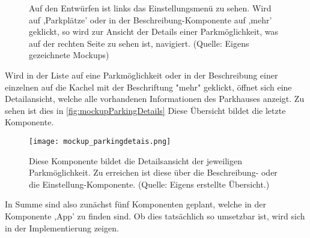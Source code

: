 \begin{figure}[h!]
	\centering
	\qquad
	\caption[Auf den Entwürfen ist links das Einstellungsmenü zu sehen. Wird auf ,Parkplätze' oder in der Beschreibung-Komponente auf ,mehr' geklickt, so wird zur Ansicht der Details einer Parkmöglichkeit, was auf der rechten Seite zu sehen ist, navigiert.]{Auf den Entwürfen ist links das Einstellungsmenü zu sehen. Wird auf ,Parkplätze' oder in der Beschreibung-Komponente auf ,mehr' geklickt, so wird zur Ansicht der Details einer Parkmöglichkeit, was auf der rechten Seite zu sehen ist, navigiert. (Quelle: Eigens gezeichnete Mockups)}
\label{fig:mockupSettings}
\label{fig:mockupParkingList}
\end{figure}
\newpage
Wird in der Liste auf eine Parkmöglichkeit oder in der Beschreibung einer einzelnen auf die Kachel mit der Beschriftung "mehr" geklickt, öffnet sich eine Detailansicht, welche alle vorhandenen Informationen des Parkhauses anzeigt. Zu sehen ist dies in \autoref{fig:mockupParkingDetails} Diese Übersicht bildet die letzte Komponente. 

\begin{figure}[h!]
	\centering
	\texttt{[image: mockup\_parkingdetais.png]}
	\caption[Diese Komponente bildet die Detailsansicht der jeweiligen Parkmöglichkeit. Zu erreichen ist diese über die Beschreibung- oder die Einstellung-Komponente.]
	{Diese Komponente bildet die Detailsansicht der jeweiligen Parkmöglichkeit. Zu erreichen ist diese über die Beschreibung- oder die Einstellung-Komponente. (Quelle: Eigens erstellte Übersicht.)}
	\label{fig:mockupParkingDetails}
\end{figure}
\newpage
In Summe sind also zunächst fünf Komponenten geplant, welche in der Komponente ,App' zu finden sind. Ob dies tatsächlich so umsetzbar ist, wird sich in der Implementierung zeigen.

